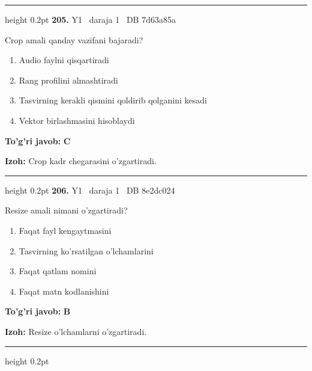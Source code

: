 \documentclass[10pt,a4paper,oneside]{article}
\begin{document}
\vspace{2mm}\hrule height 0.2pt \vspace{4mm}
\hypertarget{q205}{\textbf{\color{ink}205.}}  {\color{muted}\scriptsize Y1 \textbullet\ daraja 1 \textbullet\ DB 7d63a85a}
\par
Crop amali qanday vazifani bajaradi?
\begin{enumerate}[label=\Alph*),leftmargin=9mm]
\item Audio faylni qisqartiradi
\item Rang profilini almashtiradi
\item Tasvirning kerakli qismini qoldirib qolganini kesadi
\item Vektor birlashmasini hisoblaydi
\end{enumerate}
\begin{tcolorbox}[enhanced,breakable,colback=teal!4,colframe=teal!45!black,boxrule=0.45pt,arc=1.2mm,left=2.8mm,right=2.8mm,top=2mm,bottom=2mm,before skip=2mm,after skip=2mm]
\textbf{\color{teal}To'g'ri javob:} \textbf{C}
\par\smallskip
\textbf{Izoh:} Crop kadr chegarasini o'zgartiradi.
\end{tcolorbox}
\vspace{2mm}\hrule height 0.2pt \vspace{4mm}
\hypertarget{q206}{\textbf{\color{ink}206.}}  {\color{muted}\scriptsize Y1 \textbullet\ daraja 1 \textbullet\ DB 8e2dc024}
\par
Resize amali nimani o'zgartiradi?
\begin{enumerate}[label=\Alph*),leftmargin=9mm]
\item Faqat fayl kengaytmasini
\item Tasvirning ko'rsatilgan o'lchamlarini
\item Faqat qatlam nomini
\item Faqat matn kodlanishini
\end{enumerate}
\begin{tcolorbox}[enhanced,breakable,colback=teal!4,colframe=teal!45!black,boxrule=0.45pt,arc=1.2mm,left=2.8mm,right=2.8mm,top=2mm,bottom=2mm,before skip=2mm,after skip=2mm]
\textbf{\color{teal}To'g'ri javob:} \textbf{B}
\par\smallskip
\textbf{Izoh:} Resize o'lchamlarni o'zgartiradi.
\end{tcolorbox}
\vspace{2mm}\hrule height 0.2pt \vspace{4mm}
\end{document}
